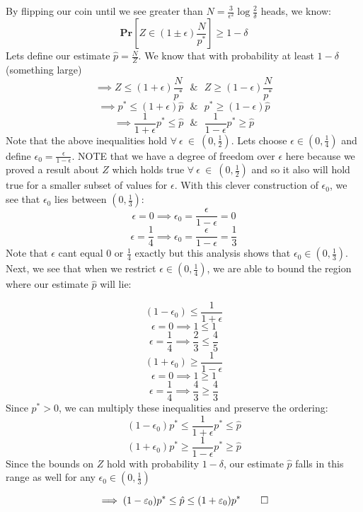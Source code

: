\documentclass[12pt]{article}
\begin{document}
\begin{solution}
\begin{solution}
\begin{answerbox}
\begin{algorithmic}
\EndProcedure
\end{algorithmic}
\end{answerbox}
By flipping our coin until we see greater than $N = \frac{3}{\epsilon^2}\log{\frac{2}{\delta}}$ heads, we know:
\[
\textbf{Pr}[Z \in (1 \pm \epsilon)\frac{N}{p^*}] \geq 1- \delta
\]
Lets define our estimate $\hat{p} = \frac{N}{Z}$. We know that with probability at least $1-\delta$ (something large)
\[
\implies Z \leq (1 + \epsilon)\frac{N}{p^*} ~~~\&~~~ Z \geq (1 - \epsilon)\frac{N}{p^*}
\]
\[
\implies p^* \leq (1 + \epsilon)\hat{p} ~~~\&~~~ p^* \geq (1 - \epsilon)\hat{p}
\]
\[
\implies \frac{1}{1 + \epsilon}p^* \leq \hat{p} ~~~\&~~~ \frac{1}{1 - \epsilon}p^* \geq \hat{p}
\]
Note that the above inequalities hold $\forall~\epsilon~\in~(0,\frac{1}{2})$. Lets choose $\epsilon \in (0,\frac{1}{4})$ and define $\epsilon_0 = \frac{\epsilon}{1-\epsilon}$. NOTE that we have a degree of freedom over $\epsilon$ here because we proved a result about $Z$ which holds true $\forall~\epsilon~\in~(0,\frac{1}{2})$ and so it also will hold true for a smaller subset of values for $\epsilon$. With this clever construction of $\epsilon_0$, we see that $\epsilon_0$ lies between $(0,\frac{1}{3})$:
\[
\epsilon = 0 \implies \epsilon_0 = \frac{\epsilon}{1 - \epsilon} = 0
\]
\[
\epsilon = \frac{1}{4} \implies \epsilon_0 = \frac{\epsilon}{1 - \epsilon} = \frac{1}{3}
\]
Note that $\epsilon$ cant equal $0$ or $\frac{1}{4}$ exactly but this analysis shows that $\epsilon_0 \in (0,\frac{1}{3})$. Next, we see that when we restrict $\epsilon \in (0,\frac{1}{4})$, we are able to bound the region where our estimate $\hat{p}$ will lie:

\[
(1-\epsilon_0) \leq \frac{1}{1 + \epsilon}
\]
\[
\epsilon = 0 \implies 1 \leq 1
\]
\[
\epsilon = \frac{1}{4} \implies \frac{2}{3} \leq \frac{4}{5}
\]
\[
(1+\epsilon_0) \geq \frac{1}{1 - \epsilon}
\]
\[
\epsilon = 0 \implies 1 \geq 1
\]
\[
\epsilon = \frac{1}{4} \implies \frac{4}{3} \geq \frac{4}{3}
\]
Since $p^* > 0$, we can multiply these inequalities and preserve the ordering:
\[
(1-\epsilon_0)p^* \leq \frac{1}{1 + \epsilon}p^* \leq \hat{p}
\]
\[
(1+\epsilon_0)p^* \geq \frac{1}{1 - \epsilon}p^* \geq \hat{p}
\]
Since the bounds on $Z$ hold with probability $1-\delta$, our estimate $\hat{p}$ falls in this range as well for any $\epsilon_0\in (0,\frac{1}{3})$

\[
\implies (1-\epsilon_0)p^* \leq \hat{p} \leq (1+\epsilon_0)p^* \qed
\]


\end{solution}


\end{solution}
\end{document}
